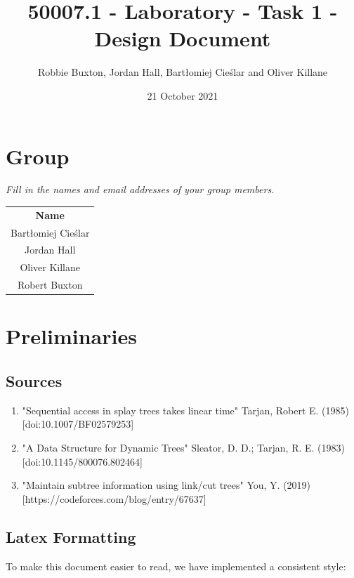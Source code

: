 \documentclass{report}
\title{50007.1 - Laboratory - Task 1 - Design Document}
\author{Robbie Buxton, Jordan Hall, Bartłomiej Cieślar and Oliver Killane}
\date{21 October 2021}
\newcommand{\question}[1]{\textit{#1} \\ }
\begin{document}
    \maketitle
    \section*{Group}
        \question{Fill in the names and email addresses of your group members.}
        \begin{center}
			\begin{tabular}{c }
				\textbf{Name} \\
				Bartłomiej Cieślar \\
				Jordan Hall \\
				Oliver Killane \\
				Robert Buxton \\
			\end{tabular}
		\end{center}

    \section*{Preliminaries}
        \subsection*{Sources}
        \begin{enumerate}
            \item "Sequential access in splay trees takes linear time" Tarjan, Robert E. (1985) [doi:10.1007/BF02579253]
            \item "A Data Structure for Dynamic Trees" Sleator, D. D.; Tarjan, R. E. (1983) [doi:10.1145/800076.802464]
            \item "Maintain subtree information using link/cut trees" You, Y. (2019) [https://codeforces.com/blog/entry/67637]
        \end{enumerate}
        \subsection*{Latex Formatting}
            To make this document easier to read, we have implemented a consistent style:
\end{document}
